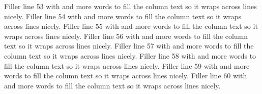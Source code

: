 Filler line 53 with  and more words to fill the column text so it wraps across lines nicely.
Filler line 54 with  and more words to fill the column text so it wraps across lines nicely.
Filler line 55 with  and more words to fill the column text so it wraps across lines nicely.
Filler line 56 with  and more words to fill the column text so it wraps across lines nicely.
Filler line 57 with  and more words to fill the column text so it wraps across lines nicely.
Filler line 58 with  and more words to fill the column text so it wraps across lines nicely.
Filler line 59 with  and more words to fill the column text so it wraps across lines nicely.
Filler line 60 with  and more words to fill the column text so it wraps across lines nicely.
